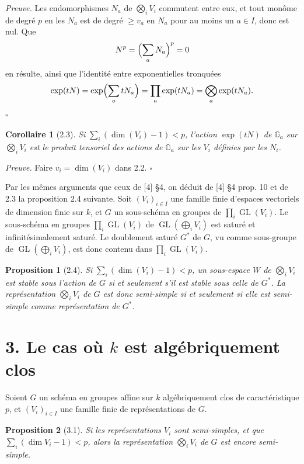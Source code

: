 \documentclass[10pt]{article}
\newcommand{\Ga}{\mathbb G_a}
\newcommand{\GL}{\operatorname{GL}}
\theoremstyle{deligne}
\newtheorem*{proposition*}{Proposition}
\newtheorem*{corollary*}{Corollaire}
\newenvironment{proofdel}{\textit{Preuve.}}{\hfill$\square$}
\begin{document}
\begin{proofdel}
Les endomorphismes \(N_a\) de \(\bigotimes_i V_i\) commutent entre eux, et tout monôme de degré \(p\) en les \(N_a\) est de degré \(\ge v_a\) en \(N_a\) pour au moins un \(a\in I\), donc est nul. Que
\[
N^p=\Bigl(\sum_a N_a\Bigr)^p=0
\]
en résulte, ainsi que l'identité entre exponentielles tronquées
\[
\exp(tN)=\exp\Bigl(\sum_a tN_a\Bigr)=\prod_a\exp(tN_a)=\bigotimes_a\exp(tN_a).
\]
\end{proofdel}

\begin{corollary*}[2.3]
Si \(\sum_i(\dim(V_i)-1)<p\), l'action \(\exp(tN)\) de \(\Ga\) sur \(\bigotimes_i V_i\) est le produit tensoriel des actions de \(\Ga\) sur les \(V_i\) définies par les \(N_i\).
\end{corollary*}

\begin{proofdel}
Faire \(v_i=\dim(V_i)\) dans 2.2.
\end{proofdel}

Par les mêmes arguments que ceux de [4] \S4, on déduit de [4] \S4 prop. 10 et de 2.3 la proposition 2.4 suivante. Soit \((V_i)_{i\in I}\) une famille finie d'espaces vectoriels de dimension finie sur \(k\), et \(G\) un sous-schéma en groupes de \(\prod_i\GL(V_i)\). Le sous-schéma en groupes \(\prod_i\GL(V_i)\) de \(\GL(\bigoplus_i V_i)\) est saturé et infinitésimalement saturé. Le doublement saturé \(G^*\) de \(G\), vu comme sous-groupe de \(\GL(\bigoplus_iV_i)\), est donc contenu dans \(\prod_i\GL(V_i)\).

\begin{proposition*}[2.4]
Si \(\sum_i(\dim(V_i)-1)<p\), un sous-espace \(W\) de \(\bigotimes_i V_i\) est stable sous l'action de \(G\) si et seulement s'il est stable sous celle de \(G^*\). La représentation \(\bigotimes_i V_i\) de \(G\) est donc semi-simple si et seulement si elle est semi-simple comme représentation de \(G^*\).
\end{proposition*}

\section*{3. Le cas où \(k\) est algébriquement clos}

Soient \(G\) un schéma en groupes affine sur \(k\) algébriquement clos de caractéristique \(p\), et \((V_i)_{i\in I}\) une famille finie de représentations de \(G\).

\begin{proposition*}[3.1]
Si les représentations \(V_i\) sont semi-simples, et que \(\sum_i(\dim V_i-1)<p\), alors la représentation \(\bigotimes_iV_i\) de \(G\) est encore semi-simple.
\end{proposition*}
\end{document}
